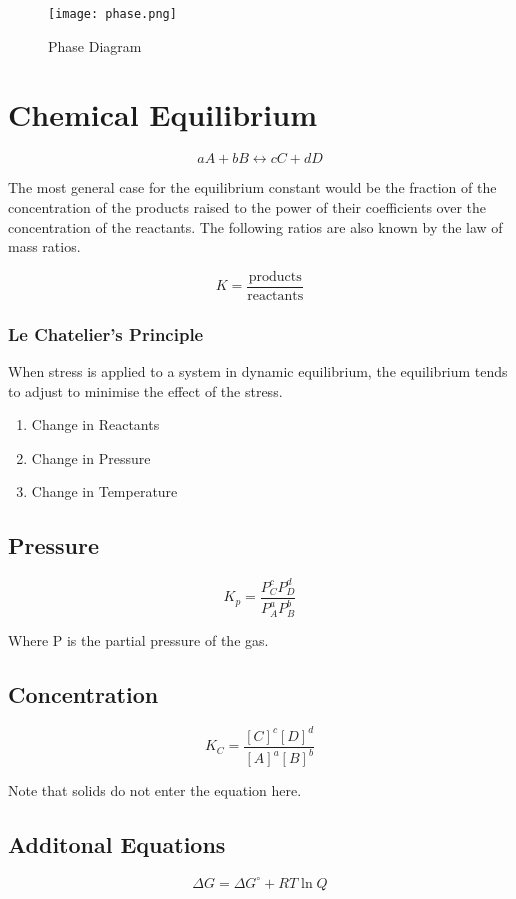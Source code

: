 \documentclass{article}
\begin{document}
\begin{figure}[hbt!]
\centering
\texttt{[image: phase.png]}
\caption{Phase Diagram}
\end{figure}

\section{Chemical Equilibrium}

\[
a A + b B \leftrightarrow c C + d D
\]


The most general case for the equilibrium constant would be the fraction of the concentration of the products raised to the power of their coefficients over the concentration of the reactants. The following ratios are also known by the law of mass ratios.

\[
K = \frac{\text{products}}{\text{reactants}}
\]

\subsubsection{Le Chatelier's Principle}
When stress is applied to a system in dynamic equilibrium, the equilibrium tends to adjust to minimise the effect of the stress.

\begin{enumerate}
\item Change in Reactants
\item Change in Pressure
\item Change in Temperature
\end{enumerate}

\subsection{Pressure}

\[
K_p= \frac{P_C^c P_D^d}{P_A^a P_B^b}
\]

Where P is the partial pressure of the gas.

\subsection{Concentration}

\[
K_C = \frac{[C]^c [D]^d}{[A]^a [B]^b}
\]

Note that solids do not enter the equation here.

\subsection{Additonal Equations}
\[
\Delta G = \Delta G^{\circ} + RT \ln Q
\]
\end{document}
